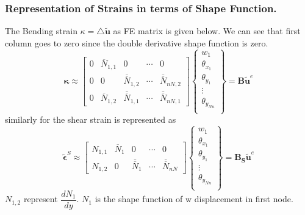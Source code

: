 \documentclass[9pt]{beamer}
\begin{document}
\begin{frame}
\frametitle{Representation of Strains in terms of Shape Function.}
The Bending strain $\kappa = \triangle \tilde{\mathbf{u}} $ as FE matrix is given below. We can see that first column goes to zero since the double derivative shape function is zero.
\begin{equation*}
\mathbf{ \kappa } \approx 
\begin{bmatrix}
0 & \overline{N}_{1,1} & 0 & \cdots & 0 \\
0&  0 & \overline{\overline{N}}_{1,2}  & \cdots & \overline{\overline{N}}_{nN,2} 
\\
0&  \overline{N}_{1,2} & \overline{\overline{N}}_{1,1}  & \cdots & \overline{\overline{N}}_{nN,1} 
\end{bmatrix} 
\left\{
\begin{array}{r}
w_1 \\
\theta_{x_1} \\
\theta_{y_1} \\
\vdots \\
\theta_{y_{Nn}} \\
\end{array} \right\}=\mathbf{ B } \tilde{\mathbf{u}}^e
\end{equation*}
similarly for the shear strain is represented as
\begin{equation}
\tilde{\mathbf{\epsilon}}^S \approx 
\begin{bmatrix}
N_{1,1} & \overline{N}_{1} & 0 & \cdots & 0 
\\
N_{1,2} & 0 & \overline{\overline{N}}_{1} & \cdots & \overline{\overline{N}}_{nN} 
\end{bmatrix} 
\left\{
\begin{array}{r}
w_1 \\
\theta_{x_1} \\
\theta_{y_1} \\
\vdots \\
\theta_{y_{Nn}} \\
\end{array} \right\}=\mathbf{ B_S }\tilde{\mathbf{u}}^e
\end{equation}
$N_{1,2}$ represent $\dfrac{dN_1}{dy} $. $N_1$ is the shape function of w displacement in first node.
\end{frame}
\end{document}
